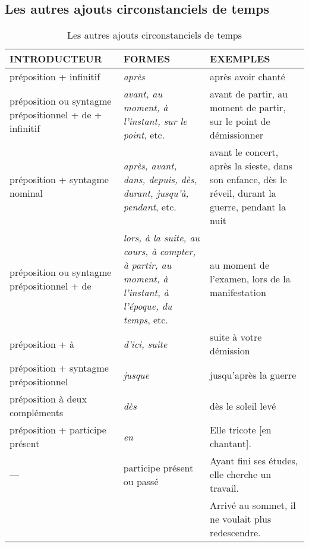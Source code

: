 \documentclass[UTF8]{report}
\begin{document}
\subsection{Les autres ajouts circonstanciels de temps}

\begin{table}[H]
    \centering
    \small
    
    \begin{adjustbox}{max width =\textwidth}
        \begin{tabular}{|p{4.5cm}|p{5cm}|p{6cm}|}
        \hline
        \rowcolor{cyan!20}
        \textbf{INTRODUCTEUR} & \textbf{FORMES} & \textbf{EXEMPLES} \\
        \hline
        préposition + infinitif & \textit{après} & après avoir chanté \\
        \hline
        préposition ou syntagme prépositionnel + de + infinitif & \textit{avant, au moment, à l'instant, sur le point}, etc. & avant de partir, au moment de partir, sur le point de démissionner \\
        \hline
        préposition + syntagme nominal & \textit{après, avant, dans, depuis, dès, durant, jusqu'à, pendant}, etc. & avant le concert, après la sieste, dans son enfance, dès le réveil, durant la guerre, pendant la nuit \\
        \hline
        préposition ou syntagme prépositionnel + de & \textit{lors, à la suite, au cours, à compter, à partir, au moment, à l'instant, à l'époque, du temps}, etc. & au moment de l'examen, lors de la manifestation \\
        \hline
        préposition + à & \textit{d'ici, suite} & suite à votre démission \\
        \hline
        préposition + syntagme prépositionnel & \textit{jusque} & jusqu'après la guerre \\
        \hline
        préposition à deux compléments & \textit{dès} & dès le soleil levé \\
        \hline
        préposition + participe présent & \textit{en} & Elle tricote [en chantant]. \\
        \hline
        --- & participe présent ou passé & Ayant fini ses études, elle cherche un travail. \\
        & & Arrivé au sommet, il ne voulait plus redescendre. \\
        \hline
        \end{tabular}
    \end{adjustbox}
    \caption{Les autres ajouts circonstanciels de temps}
\end{table}
\end{document}
